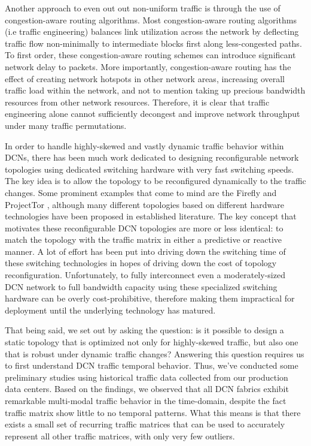 \documentclass[sigconf]{acmart}
\theoremstyle{definition}
\begin{document}
Another approach to even out out non-uniform traffic is through the use of congestion-aware routing algorithms. Most congestion-aware routing algorithms (i.e traffic engineering) balances link utilization across the network by deflecting traffic flow non-minimally to intermediate blocks first along less-congested paths. To first order, these congestion-aware routing schemes can introduce significant network delay to packets. More importantly, congestion-aware routing has the effect of creating network hotspots in other network areas, increasing overall traffic load within the network, and not to mention taking up precious bandwidth resources from other network resources. Therefore, it is clear that traffic engineering alone cannot sufficiently decongest and improve network throughput under many traffic permutations. 

In order to handle highly-skewed and vastly dynamic traffic behavior within DCNs, there has been much work dedicated to designing reconfigurable network topologies using dedicated switching hardware with very fast switching speeds. The key idea is to allow the topology to be reconfigured dynamically to the traffic changes. Some prominent examples that come to mind are the Firefly \cite{hamedazimi2014firefly} and ProjectTor \cite{ghobadi2016projector}, although many different topologies based on different hardware technologies have been proposed in established literature. The key concept that motivates these reconfigurable DCN topologies are more or less identical: to match the topology with the traffic matrix in either a predictive or reactive manner. A lot of effort has been put into driving down the switching time of these switching technologies in hopes of driving down the cost of topology reconfiguration. Unfortunately, to fully interconnect even a moderately-sized DCN network to full bandwidth capacity using these specialized switching hardware can be overly cost-prohibitive, therefore making them impractical for deployment until the underlying technology has matured.

That being said, we set out by asking the question: is it possible to design a static topology that is optimized not only for highly-skewed traffic, but also one that is robust under dynamic traffic changes? Answering this question requires us to first understand DCN traffic temporal behavior. Thus, we've conducted some preliminary studies using historical traffic data collected from our production data centers. Based on the findings, we observed that all DCN fabrics exhibit remarkable multi-modal traffic behavior in the time-domain, despite the fact traffic matrix show little to no temporal patterns. What this means is that there exists a small set of recurring traffic matrices that can be used to accurately represent all other traffic matrices, with only very few outliers. 
\end{document}
